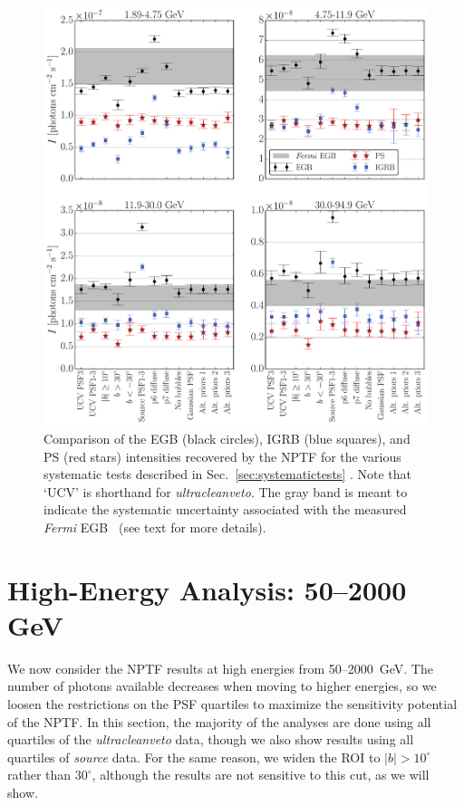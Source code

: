 \begin{figure}[!phtb] %
   \centering
   \includegraphics[width=\textwidth]{ch-igrb/plots/combined_intensities_v3.pdf} 
   \caption{Comparison of the EGB (black circles), IGRB (blue squares), and PS (red stars) intensities recovered by the NPTF for the various systematic tests described in Sec.~\ref{sec:systematictests}
   .  Note that `UCV' is shorthand for {\it ultracleanveto}.  The gray band is meant to indicate the systematic uncertainty associated with the measured \emph{Fermi} EGB~\cite{Ackermann:2014usa} (see text for more details).}
   \label{fig:systematicsplot}
\end{figure}

\section{High-Energy Analysis: 50--2000 GeV}
\label{sec:highenergy}

We now consider the NPTF results at high energies from 50--2000~GeV.  The number of photons available decreases when moving to higher energies, so we loosen the restrictions on the PSF quartiles to maximize the sensitivity potential of the NPTF.  In this section, the majority of the analyses are done using all quartiles of the {\it ultracleanveto} data, though we also show results using all quartiles of {\it source} data.  For the same reason, we widen the ROI to $|b| > 10^\circ$ rather than $30^\circ$, although the results are not sensitive to this cut, as we will show.

